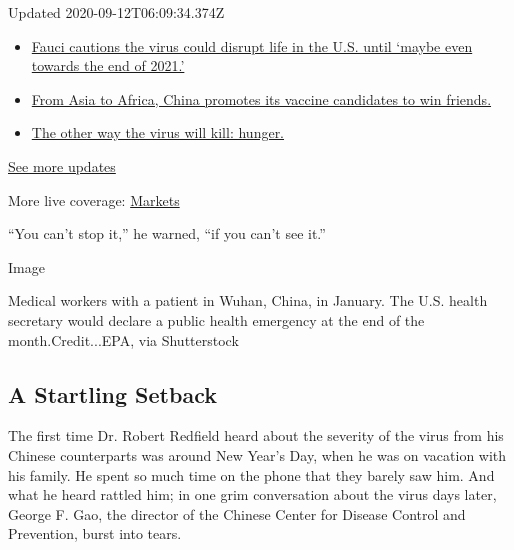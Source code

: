 Updated 2020-09-12T06:09:34.374Z

\begin{itemize}
\tightlist
\item
  \href{https://www.nytimes3xbfgragh.onion/2020/09/11/world/covid-19-coronavirus.html?action=click\&pgtype=Article\&state=default\&region=MAIN_CONTENT_1\&context=storylines_live_updates\#link-dfb8a16}{Fauci
  cautions the virus could disrupt life in the U.S. until `maybe even
  towards the end of 2021.'}
\item
  \href{https://www.nytimes3xbfgragh.onion/2020/09/11/world/covid-19-coronavirus.html?action=click\&pgtype=Article\&state=default\&region=MAIN_CONTENT_1\&context=storylines_live_updates\#link-7104d154}{From
  Asia to Africa, China promotes its vaccine candidates to win friends.}
\item
  \href{https://www.nytimes3xbfgragh.onion/2020/09/11/world/covid-19-coronavirus.html?action=click\&pgtype=Article\&state=default\&region=MAIN_CONTENT_1\&context=storylines_live_updates\#link-393ad215}{The
  other way the virus will kill: hunger.}
\end{itemize}

\href{https://www.nytimes3xbfgragh.onion/2020/09/11/world/covid-19-coronavirus.html?action=click\&pgtype=Article\&state=default\&region=MAIN_CONTENT_1\&context=storylines_live_updates}{See
more updates}

More live coverage:
\href{https://www.nytimes3xbfgragh.onion/live/2020/09/11/business/stock-market-today-coronavirus?action=click\&pgtype=Article\&state=default\&region=MAIN_CONTENT_1\&context=storylines_live_updates}{Markets}

``You can't stop it,'' he warned, ``if you can't see it.''

Image

Medical workers with a patient in Wuhan, China, in January. The U.S.
health secretary would declare a public health emergency at the end of
the month.Credit...EPA, via Shutterstock

\hypertarget{a-startling-setback}{%
\subsection{A Startling Setback}\label{a-startling-setback}}

The first time Dr. Robert Redfield heard about the severity of the virus
from his Chinese counterparts was around New Year's Day, when he was on
vacation with his family. He spent so much time on the phone that they
barely saw him. And what he heard rattled him; in one grim conversation
about the virus days later, George F. Gao, the director of the Chinese
Center for Disease Control and Prevention, burst into tears.

